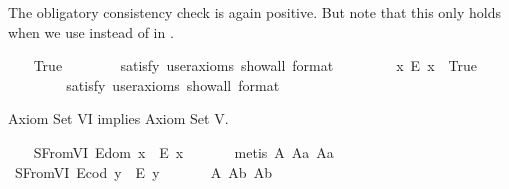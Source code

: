 \begin{isabellebody}
\begin{isamarkuptext}%
The obligatory consistency check is again positive. But note that this only holds when we
  use \isa{{\isasymsimeq}} instead of  \isa{{\isasymcong}} in  .%
\end{isamarkuptext}\isamarkuptrue%
\ \ \isamarkupfalse%
\ True\ \ %
\isanewline
\ \ \ \ \isamarkupfalse%
\ {\isacharbrackleft}satisfy{\isacharcomma}\ user{\isacharunderscore}axioms{\isacharcomma}\ show{\isacharunderscore}all{\isacharcomma}\ format\ {\isacharequal}\ {}{\isacharbrackright}%
\isadelimproof
\ %
\endisadelimproof
%
\isatagproof
{}\isamarkupfalse%
%
\endisatagproof
{\isafoldproof}%
%
\isadelimproof
%
\endisadelimproof
\isanewline
\ \ \isamarkupfalse%
\ \ {\isachardoublequoteopen}{\isasymexists}x{\isachardot}\ \isactrlbold {\isasymnot}{\isacharparenleft}E\ x{\isacharparenright}{\isachardoublequoteclose}\ \ True\ \ \ %
\ \ \isanewline
\ \ \ \ \isamarkupfalse%
\ {\isacharbrackleft}satisfy{\isacharcomma}\ user{\isacharunderscore}axioms{\isacharcomma}\ show{\isacharunderscore}all{\isacharcomma}\ format\ {\isacharequal}\ {}{\isacharbrackright}%
\isadelimproof
\ %
\endisadelimproof
%
\isatagproof
{}\isamarkupfalse%
%
\endisatagproof
{\isafoldproof}%
%
\isadelimproof
%
\endisadelimproof
%
\begin{isamarkuptext}%
Axiom Set VI implies Axiom Set V.%
\end{isamarkuptext}\isamarkuptrue%
\ \ \isamarkupfalse%
\ S{}FromVI{\isacharcolon}\ {\isachardoublequoteopen}E{\isacharparenleft}dom\ x{\isacharparenright}\ \isactrlbold {\isasymrightarrow}\ E\ x{\isachardoublequoteclose}\ \isanewline
%
\isadelimproof
\ \ \ \ %
\endisadelimproof
%
\isatagproof
{}\isamarkupfalse%
\ {\isacharparenleft}metis\ A{}\ A{}a\ A{}a{\isacharparenright}%
\endisatagproof
{\isafoldproof}%
%
\isadelimproof
\isanewline
%
\endisadelimproof
\ \ \isamarkupfalse%
\ S{}FromVI{\isacharcolon}\ {\isachardoublequoteopen}E{\isacharparenleft}cod\ y{\isacharparenright}\ \isactrlbold {\isasymrightarrow}\ E\ y{\isachardoublequoteclose}\ \isanewline
%
\isadelimproof
\ \ \ \ %
\endisadelimproof
%
\isatagproof
{}\isamarkupfalse%
\ A{}\ A{}b\ A{}b\ \isamarkupfalse%

\end{isabellebody}
